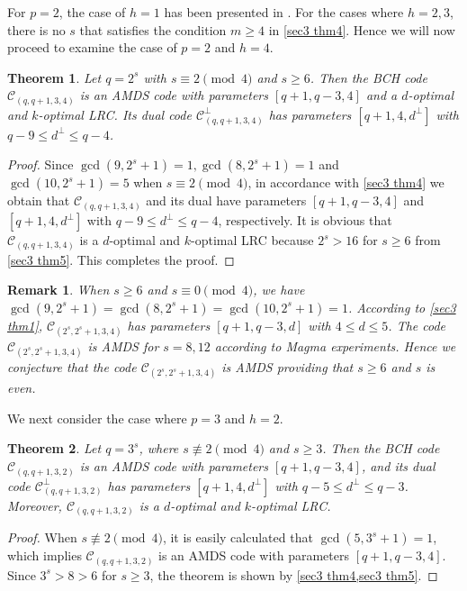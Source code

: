 \documentclass[10pt]{article}%
\newtheorem{theorem}{Theorem}%
\newtheorem{remark}{Remark}%
\begin{document}
	For $p=2$, the case of $h=1$ has been presented in \cite{Ding2020InfiniteFamiliesMDS}. For the cases where $h=2,3$, there is no $s$ that satisfies the condition $m\ge4$ in \cref{sec3 thm4}. Hence we will now proceed to examine the case of $p=2$ and $h=4$.
	
	\begin{theorem}
		\label{sec3 cor3}
		Let $q=2^s$ with $s \equiv 2 \pmod 4$ and $s \ge 6$. Then the BCH code $\mathcal{C}_{(q,q+1,3,4)}$ is an AMDS code with parameters $[q+1,q-3,4]$ and a $d$-optimal and $k$-optimal LRC. Its dual code $\mathcal{C}_{(q,q+1,3,4)}^{\perp}$ has parameters $[q+1,4,d^{\perp}]$ with $q-9 \le d^\perp \le q-4$.
	\end{theorem}
	\begin{proof}
		Since $\gcd(9,2^s+1)=1,\gcd(8,2^s+1)=1$ and $\gcd(10,2^s+1)=5$ when $s \equiv 2 \pmod 4$, in accordance with \cref{sec3 thm4} we obtain that $\mathcal{C}_{(q,q+1,3,4)}$ and its dual have parameters $[q+1,q-3,4]$ and $[q+1,4,d^{\perp}]$ with $q-9 \le d^\perp \le q-4$, respectively. It is obvious that $\mathcal{C}_{(q,q+1,3,4)}$ is a $d$-optimal and $k$-optimal LRC because $2^s>16$ for $s\ge6$ from \cref{sec3 thm5}. This completes the proof.
	\end{proof}
	
	\begin{remark}\label{sec4 rmk2}
		When $s\ge6$ and $s\equiv0\pmod4$, we have $\gcd(9,2^s+1)=\gcd(8,2^s+1)=\gcd(10,2^s+1)=1$. According to \cref{sec3 thm1}, $\mathcal{C}_{(2^s,2^s+1,3,4)}$ has parameters $[q+1,q-3,d]$ with $4\le d\le 5$. The code $\mathcal{C}_{(2^s,2^s+1,3,4)}$ is AMDS for $s=8,12$ according to Magma experiments. Hence we conjecture that the code $\mathcal{C}_{(2^s,2^s+1,3,4)}$ is AMDS providing that $s\ge 6$ and $s$ is even.
	\end{remark}
	
	We next consider the case where $p=3$ and $h=2$.
	\begin{theorem}
		\label{sec4 thm4}
		Let $q=3^s$, where $s\not\equiv2\pmod4$ and $s \ge 3$. Then the BCH code $\mathcal{C}_{(q,q+1,3,2)}$ is an AMDS code with parameters $[q+1,q-3,4]$, and its dual code $\mathcal{C}_{(q,q+1,3,2)}^{\perp}$ has parameters $[q+1,4,d^{\perp}]$ with $q-5 \le d^\perp \le q-3$. Moreover, $\mathcal{C}_{(q,q+1,3,2)}$ is a $d$-optimal and $k$-optimal LRC.
	\end{theorem}
	\begin{proof}
		When $s\not\equiv2\pmod4$, it is easily calculated that $\gcd(5,3^s+1)=1$, which implies $\mathcal{C}_{(q,q+1,3,2)}$ is an AMDS code with parameters $[q+1,q-3,4]$. Since $3^s>8>6$ for $s\ge3$, the theorem is shown by \cref{sec3 thm4,sec3 thm5}.
	\end{proof}
	
\end{document}
